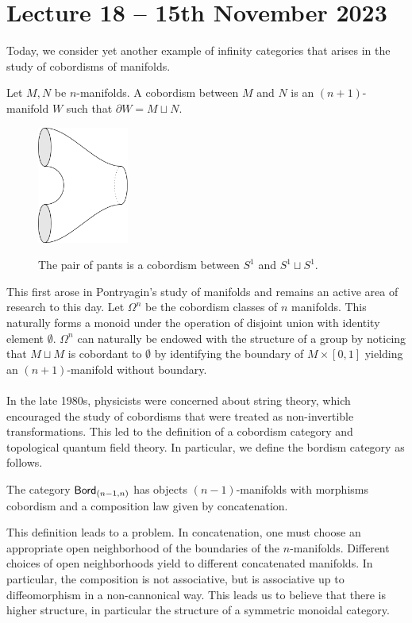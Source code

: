 \section{Lecture 18 -- 15th November 2023}
Today, we consider yet another example of infinity categories that arises in the study of cobordisms of manifolds. 
\begin{definition}[Cobordism]\label{def: cobordism}
    Let $M,N$ be $n$-manifolds. A cobordism between $M$ and $N$ is an $(n+1)$-manifold $W$ such that $\partial W=M\sqcup N$. 
\end{definition}
\begin{figure}[h]
    \includegraphics[width=3cm]{Pants.png}
    \label{fig: pair of pants}
    \caption{The pair of pants is a cobordism between $S^{1}$ and $S^{1}\sqcup S^{1}$.}
\end{figure}
This first arose in Pontryagin's study of manifolds and remains an active area of research to this day. Let $\Omega^{n}$ be the cobordism classes of $n$ manifolds. This naturally forms a monoid under the operation of disjoint union with identity element $\emptyset$. $\Omega^{n}$ can naturally be endowed with the structure of a group by noticing that $M\sqcup M$ is cobordant to $\emptyset$ by identifying the boundary of $M\times[0,1]$ yielding an $(n+1)$-manifold without boundary. \\\\
In the late 1980s, physicists were concerned about string theory, which encouraged the study of cobordisms that were treated as non-invertible transformations. This led to the definition of a cobordism category and topological quantum field theory. In particular, we define the bordism category as follows. 
\begin{definition}[$\Bord_{(n-1,n)}$]
    The category $\Bord_{(n-1,n)}$ has objects $(n-1)$-manifolds with morphisms cobordism and a composition law given by concatenation. 
\end{definition}
This definition leads to a problem. In concatenation, one must choose an appropriate open neighborhood of the boundaries of the $n$-manifolds. Different choices of open neighborhoods yield to different concatenated manifolds. In particular, the composition is not associative, but is associative up to diffeomorphism in a non-cannonical way. This leads us to believe that there is higher structure, in particular the structure of a symmetric monoidal category. 
